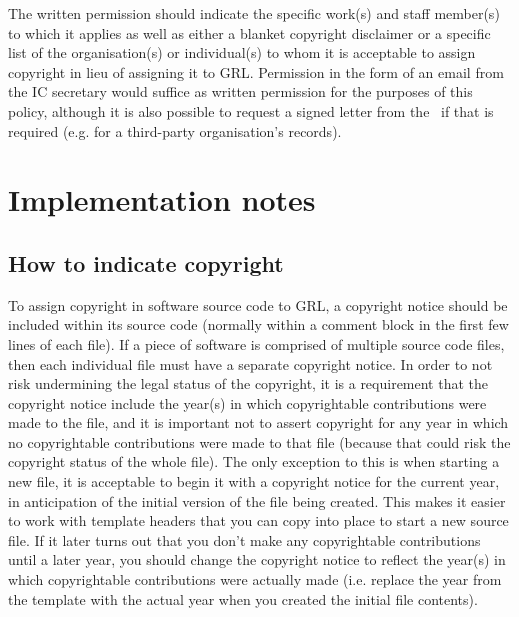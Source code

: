 \documentclass[10pt,a4paper]{article}
\begin{document}
\par The written permission should indicate the specific work(s) and staff member(s) 
to which it applies as well as either a blanket copyright disclaimer or a specific list of 
the organisation(s) or individual(s) to whom it is acceptable to assign copyright in 
lieu of assigning it to GRL. Permission in the form of an email from the IC secretary 
would suffice as written permission for the purposes of this policy, although it is also 
possible to request a signed letter from the \exectitle\ if that is required (e.g. for a 
third-party organisation's records). 






\section{Implementation notes}
\label{section:impnotes}

\subsection{How to indicate copyright}
\label{section:howto.copyright}
\par To assign copyright in software source code to GRL, a copyright notice should 
be included within its source code (normally within a comment block in the first 
few lines of each file). If a piece of software is comprised of multiple source code 
files, then each individual file must have a separate copyright notice. In order to 
not risk undermining the legal status of the copyright, it is a requirement that the 
copyright notice include the year(s) in which copyrightable contributions were 
made to the file, and it is important not to assert copyright for any year in which 
no copyrightable contributions were made to that file (because that could risk the 
copyright status of the whole file). The only exception to this is when starting a 
new file, it is acceptable to begin it with a copyright notice for the current year, in 
anticipation of the initial version of the file being created. This makes it easier to 
work with template headers that you can copy into place to start a new source 
file. If it later turns out that you don't make any copyrightable contributions until 
a later year, you should change the copyright notice to reflect the year(s) in which 
copyrightable contributions were actually made (i.e. replace the year from the 
template with the actual year when you created the initial file contents). 
\end{document}
